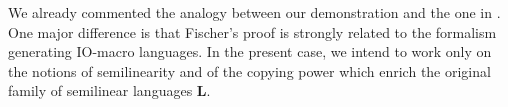 We already commented the analogy between our demonstration and the one in \cite{fischerphd}. One major difference is that Fischer's proof is strongly related to the formalism generating IO-macro languages. In the present case, we intend to work only on the notions of semilinearity and of the copying power which enrich the original family of semilinear languages \textbf{L}.

%
